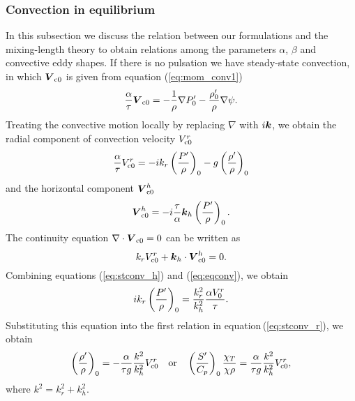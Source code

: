 \documentclass[fleqn,usenatbib]{mnras}
\def\bm#1{\mbox{\boldmath$#1$}}
\begin{document}
\subsubsection{Convection in equilibrium}
In this subsection we discuss the relation between our formulations and the mixing-length theory to obtain relations among the parameters $\alpha$, $\beta$ and 
convective eddy shapes.
If there is no pulsation we have steady-state convection, in which $\bm{V}_{\rm c0}$ is
given from equation (\ref{eq:mom_conv1})
\begin{equation}
{\alpha\over\tau}\bm{V}_{{\rm c}0}=-{1\over\rho}\nabla P'_0 - {\rho'_0\over\rho}
\nabla\psi. 
\end{equation}
Treating the convective motion locally by replacing $\nabla$ with $i\bm{k}$, 
we obtain the radial component of convection velocity $V_{\rm c0}^r$
\begin{equation}
{\alpha\over\tau}V_{{\rm c}0}^r=-ik_r\left(P'\over\rho\right)_0 
- g\left({\rho'\over\rho}\right)_0 
\label{eq:stconv_r}
\end{equation}
and the horizontal component $\bm{V}_{\rm c0}^h$
\begin{equation} 
\bm{V}_{{\rm c}0}^h = -i{\tau\over\alpha}\bm{k}_h\left(P'\over\rho\right)_0.
\label{eq:stconv_h}
\end{equation}
The continuity equation $\nabla\cdot\bm{V}_{{\rm c}0} = 0$ can be written as
\begin{equation}
k_rV_{{\rm c}0}^r+\bm{k}_h\cdot\bm{V}_{{\rm c}0}^h = 0.
\label{eq:eqconv}
\end{equation}
Combining equations (\ref{eq:stconv_h}) and (\ref{eq:eqconv}), we obtain
\begin{equation}
ik_r\left(P'\over\rho\right)_0={k_r^2\over k_h^2}{\alpha V_0^r\over \tau} .
\end{equation}
Substituting this equation into the first relation in equation\,(\ref{eq:stconv_r}), 
we obtain
\begin{equation}
\left({\rho'\over\rho}\right)_0=-{\alpha\over\tau g}{k^2\over k_h^2}V_{{\rm c}0}^r
\quad {\rm or} \quad
\left({S'\over C_p}\right)_0{\chi_T\over\chi\rho}={\alpha\over\tau g}{k^2\over k_h^2}V_{{\rm c}0}^r,
\label{eq:st_rho_s}
\end{equation}
where $k^2 = k_r^2 + k_h^2$.
\end{document}

